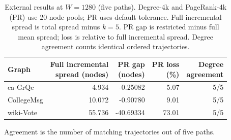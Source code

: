 \begin{table}[htbp]
\caption{External results at $W=1280$ (five paths). Degree-4k and PageRank-4k (PR) use 20-node pools; PR uses default tolerance. Full incremental spread is total spread minus $k=5$. PR gap is restricted minus full mean spread; loss is relative to full incremental spread. Degree agreement counts identical ordered trajectories.}\label{tab:primary}
\begin{tabular}{lrrrr}
\toprule
Graph & \shortstack{Full incremental\\spread (nodes)} & \shortstack{PR gap\\(nodes)} & \shortstack{PR loss\\(\%)} & \shortstack{Degree\\agreement} \\
\midrule
ca-GrQc & 4.934 & -0.25082 & 5.07 & 5/5 \\
CollegeMsg & 10.072 & -0.90780 & 9.01 & 5/5 \\
wiki-Vote & 55.736 & -40.69334 & 73.01 & 5/5 \\
\bottomrule
\end{tabular}
\par\smallskip\footnotesize Agreement is the number of matching trajectories out of five paths.
\end{table}

